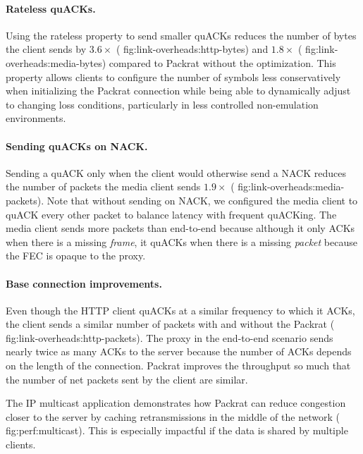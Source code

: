 \paragraph{Rateless quACKs.}
Using the rateless property to send smaller quACKs
reduces the number of bytes the client sends by $3.6\!\times$ (\Cref
{fig:link-overheads:http-bytes}) and $1.8\!\times$ (\Cref
{fig:link-overheads:media-bytes}) compared to Packrat without the optimization.
This property allows clients to configure the number of symbols less
conservatively when initializing the Packrat connection while being able to
dynamically adjust to changing loss conditions, particularly in less controlled
non-emulation environments.

\paragraph{Sending quACKs on NACK.}

Sending a quACK only when the client would otherwise send a NACK reduces the
number of packets the media client sends $1.9\!\times$ (\Cref
{fig:link-overheads:media-packets}). Note that without sending on NACK, we
configured the media client to quACK every other packet to balance latency with
frequent quACKing. The media client sends more packets than end-to-end because
although it only ACKs when there is a missing \textit{frame}, it quACKs when
there is a missing \textit{packet} because the FEC is opaque to the proxy.

\paragraph{Base connection improvements.}

Even though the HTTP client quACKs at a similar frequency to which it ACKs, the
client sends a similar number of packets with and without the Packrat (\Cref
{fig:link-overheads:http-packets}). The proxy in the end-to-end scenario sends
nearly twice as many ACKs to the server because the number of ACKs depends on
the length of the connection. Packrat improves the throughput so much that the
number of net packets sent by the client are similar.

The IP multicast application demonstrates how Packrat can reduce congestion closer
to the server by caching retransmissions in the middle of the network (\Cref
{fig:perf:multicast}). This is especially impactful if the data is shared by
multiple clients.\\

